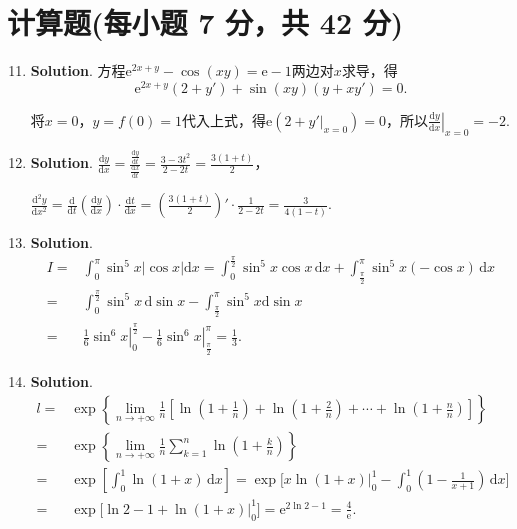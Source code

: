 \documentclass[../Main.tex]{subfiles}
\begin{document}
\section{计算题(每小题 7 分，共 42 分)}
\begin{enumerate}
    \setcounter{enumi}{10}
    \item \textbf{Solution}. 方程$\mathrm{e}^{2x+y}-\cos(xy)=\mathrm{e}-1$两边对$x$求导，得
          \[
              \mathrm{e}^{2x+y}(2+y')+\sin(xy)(y+xy')=0.
          \]

          将$x=0$，$y=f(0)=1$代入上式，得$\mathrm{e}(2+\left.y'\right|_{x=0})=0$，所以$\left
              .\frac{\mathrm{d}y}{\mathrm{d}x}\right|_{x=0}=-2$.

    \item \textbf{Solution}. $\frac{\mathrm{d}y}{\mathrm{d}x}=\frac{\frac{\mathrm{d}y}{\mathrm{d}t}}{\frac{\mathrm{d}x}{\mathrm{d}t}}
              =\frac{3-3t^{2}}{2-2t}=\frac{3(1+t)}{2}$，

          $\frac{\mathrm{d}^{2}y}{\mathrm{d}x^{2}}=\frac{\mathrm{d}}{\mathrm{d}t}\left
              (\frac{\mathrm{d}y}{\mathrm{d}x}\right)\cdot\frac{\mathrm{d}t}{\mathrm{d}x}
              =\left(\frac{3(1+t)}{2}\right)'\cdot\frac{1}{2-2t}=\frac{3}{4(1-t)}$.

    \item \textbf{Solution}.
          \[
              \begin{aligned}
                  I = & \int_{0}^{\pi}\sin^{5} x|\cos x|\mathrm{d}x = \int_{0}^{\frac{\pi}{2}}\sin^{5} x\cos x\,\mathrm{d}x + \int_{\frac{\pi}{2}}^{\pi}\sin^{5} x(-\cos x)\,\mathrm{d}x \\
                  =   & \int_{0}^{\frac{\pi}{2}}\sin^{5} x\,\mathrm{d}\sin x - \int_{\frac{\pi}{2}}^{\pi}\sin^{5} x \mathrm{d}\sin x                                                     \\
                  =   & \left.\frac{1}{6}\sin^{6} x\right|_{0}^{\frac{\pi}{2}}- \left.\frac{1}{6}\sin^{6} x\right|_{\frac{\pi}{2}}^{\pi}= \frac{1}{3}.
              \end{aligned}
          \]

    \item \textbf{Solution}.
          \[
              \begin{aligned}
                  l = & \exp\left\{\lim_{n\to+\infty}\frac{1}{n}\left[\ln\left(1+\frac{1}{n}\right)+\ln\left(1+\frac{2}{n}\right)+\cdots+\ln\left(1+\frac{n}{n}\right)\right]\right\} \\
                  =   & \exp\left\{\lim_{n\to+\infty}\frac{1}{n}\sum_{k=1}^{n}\ln\left(1+\frac{k}{n}\right)\right\}                                                                   \\
                  =   & \exp\left[\int_{0}^{1}\ln(1+x)\,\mathrm{d}x\right] = \exp\Bigg[x\ln(1+x)\Bigg|_{0}^{1}-\int_{0}^{1}\left(1-\frac{1}{x+1}\right)\,\mathrm{d}x\Bigg]            \\
                  =   & \exp\Bigg[\ln 2 - 1 +\ln(1+x)\Bigg|_{0}^{1}\Bigg] = \mathrm{e}^{2\ln 2-1}=\frac{4}{\mathrm{e}}.
              \end{aligned}
          \]


\end{enumerate}
\end{document}

